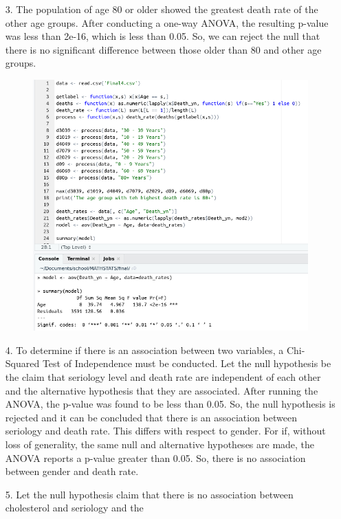 \documentclass[12pt]{article}
\begin{document}
\begin{enumerate}
\begin{figure}[!h]
	\end{figure}
	\item[3.] The population of age 80 or older showed the greatest death rate of the other age groups. 
		After conducting a one-way ANOVA, the resulting p-value was less than 2e-16, which is less than 0.05.
		So, we can reject the null that there is no significant difference between those older than 80 and other age groups.
	\begin{figure}[!h]
		\centering
		\includegraphics[width=\linewidth]{p3-p.png}
	\end{figure}
	\item[4.] To determine if there is an association between two variables, a Chi-Squared Test of Independence must 
		be conducted. Let the null hypothesis be the claim that seriology level and death rate are independent of 
		each other and the alternative hypothesis that they are associated. After running the ANOVA, the p-value was found to be less than 0.05. So, the null hypothesis is rejected and it can be 
		concluded that there is an association between seriology and death rate. This differs with respect to gender. 
		For if, without loss of generality, the same null and alternative hypotheses are made, the ANOVA
		 reports a p-value greater than 0.05. So, there is no association between gender and death rate.
	\item[5.] Let the null hypothesis claim that there is no association between cholesterol and seriology and the 

\end{enumerate}
\end{document}
